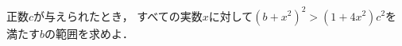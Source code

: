 \documentclass[../../main.tex]{subfiles}
\begin{document}
正数$c$が与えられたとき，
すべての実数$x$に対して${(b+x^2)}^2>(1+4x^2)c^2$を満たす$b$の範囲を求めよ．
\end{document}
